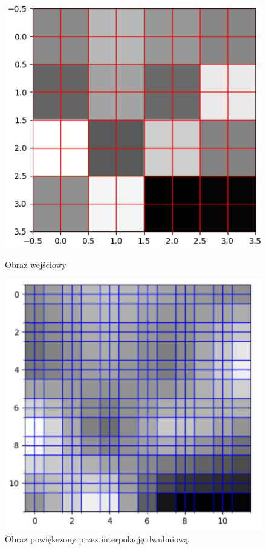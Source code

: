 \begin{figure}[ht]
    \centering
    \begin{minipage}[t]{0.33\linewidth}
        \includegraphics[width=\linewidth]{Rozdziały/02.Podstawy_teoretyczne/Obrazy/bilinear_original.png}
        \caption{Obraz wejściowy}
        \label{fig:image7}
    \end{minipage}
    \hspace{0.5cm}
    \begin{minipage}[t]{0.33\linewidth}
        \includegraphics[width=\linewidth]{Rozdziały/02.Podstawy_teoretyczne/Obrazy/bilinear_enlarged.png}
        \caption{Obraz powiększony przez interpolację dwuliniową}
        \label{fig:image8}
    \end{minipage}
\end{figure}

